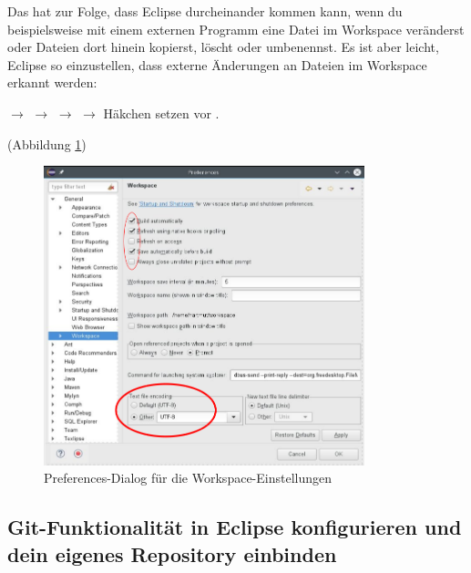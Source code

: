 Das hat zur Folge, dass Eclipse durcheinander kommen kann, wenn du
beispielsweise mit einem externen Programm eine Datei im Workspace veränderst
oder Dateien dort hinein kopierst, löscht oder umbenennst.
Es ist aber leicht, Eclipse so einzustellen, dass externe Änderungen an Dateien
im Workspace erkannt werden:

 $\rightarrow$  $\rightarrow$
 $\rightarrow$  $\rightarrow$
Häkchen setzen vor .

(Abbildung \ref{fig:eclipse-workspace-preferences}) 

\begin{figure}[h]
  \centering
  \includegraphics[width=0.83\textwidth]{./inf/SEKII/01_Vorbereitung/Eclipse-Workspace-Preferences.png}
  \caption{Preferences-Dialog für die Workspace-Einstellungen}
  \label{fig:eclipse-workspace-preferences}
\end{figure}

\afterpage{\clearpage}

\subsection{Git-Funktionalität in Eclipse konfigurieren und dein eigenes
Repository einbinden}

